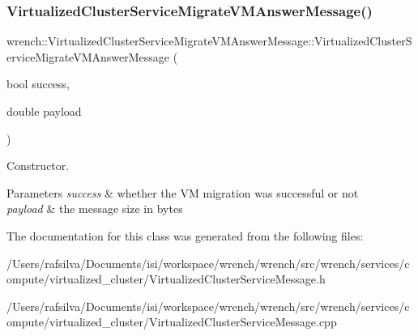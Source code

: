 \subsubsection{\texorpdfstring{Virtualized\+Cluster\+Service\+Migrate\+V\+M\+Answer\+Message()}{VirtualizedClusterServiceMigrateVMAnswerMessage()}}
{\footnotesize\ttfamily wrench\+::\+Virtualized\+Cluster\+Service\+Migrate\+V\+M\+Answer\+Message\+::\+Virtualized\+Cluster\+Service\+Migrate\+V\+M\+Answer\+Message (\begin{DoxyParamCaption}\item[{bool}]{success,  }\item[{double}]{payload }\end{DoxyParamCaption})}



Constructor. 


\begin{DoxyParams}{Parameters}
{\em success} & whether the VM migration was successful or not \\
\hline
{\em payload} & the message size in bytes \\
\hline
\end{DoxyParams}


The documentation for this class was generated from the following files\+:\begin{DoxyCompactItemize}
\item 
/\+Users/rafsilva/\+Documents/isi/workspace/wrench/wrench/src/wrench/services/compute/virtualized\+\_\+cluster/Virtualized\+Cluster\+Service\+Message.\+h\item 
/\+Users/rafsilva/\+Documents/isi/workspace/wrench/wrench/src/wrench/services/compute/virtualized\+\_\+cluster/Virtualized\+Cluster\+Service\+Message.\+cpp\end{DoxyCompactItemize}

